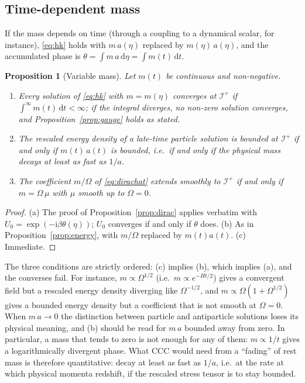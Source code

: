 \documentclass[11pt,a4paper]{article}
\newtheorem{proposition}{Proposition}
\theoremstyle{definition}
\newcommand{\scri}{\mathscr{I}^{+}}
\newcommand{\dd}{\mathrm{d}}
\newcommand{\ii}{\mathrm{i}}
\begin{document}
\subsection{Time-dependent mass}
\label{sec:varmass}

If the mass depends on time (through a coupling to a dynamical scalar, for instance), \eqref{eq:hk} holds with $m\,a(\eta)$ replaced by $m(\eta)\,a(\eta)$, and the accumulated phase is $\theta=\int m\,a\,\dd\eta=\int m(t)\,\dd t$.

\begin{proposition}[Variable mass]
\label{prop:varmass}
Let $m(t)$ be continuous and non-negative.
\begin{enumerate}[label=(\alph*)]
\item Every solution of \eqref{eq:hk} with $m=m(\eta)$ converges at $\scri$ if $\int^{\infty}m(t)\,\dd t<\infty$; if the integral diverges, no non-zero solution converges, and Proposition~\ref{prop:gauge} holds as stated.
\item The rescaled energy density of a late-time particle solution is bounded at $\scri$ if and only if $m(t)\,a(t)$ is bounded, i.e.\ if and only if the physical mass decays at least as fast as $1/a$.
\item The coefficient $m/\Omega$ of \eqref{eq:dirachat} extends smoothly to $\scri$ if and only if $m=\Omega\,\mu$ with $\mu$ smooth up to $\Omega=0$.
\end{enumerate}
\end{proposition}
\begin{proof}
(a) The proof of Proposition~\ref{prop:dirac} applies verbatim with $U_{0}=\exp(-\ii\beta\theta(\eta))$; $U_{0}$ converges if and only if $\theta$ does. (b) As in Proposition~\ref{prop:energy}, with $m/\Omega$ replaced by $m(t)a(t)$. (c) Immediate.
\end{proof}

The three conditions are strictly ordered: (c) implies (b), which implies (a), and the converses fail. For instance, $m\propto\Omega^{1/2}$ (i.e.\ $m\propto e^{-Ht/2}$) gives a convergent field but a rescaled energy density diverging like $\Omega^{-1/2}$, and $m\propto\Omega(1+\Omega^{1/2})$ gives a bounded energy density but a coefficient that is not smooth at $\Omega=0$. When $m\,a\to0$ the distinction between particle and antiparticle solutions loses its physical meaning, and (b) should be read for $m\,a$ bounded away from zero. In particular, a mass that tends to zero is not enough for any of them: $m\propto1/t$ gives a logarithmically divergent phase. What CCC would need from a ``fading'' of rest mass is therefore quantitative: decay at least as fast as $1/a$, i.e.\ at the rate at which physical momenta redshift, if the rescaled stress tensor is to stay bounded.
\end{document}
